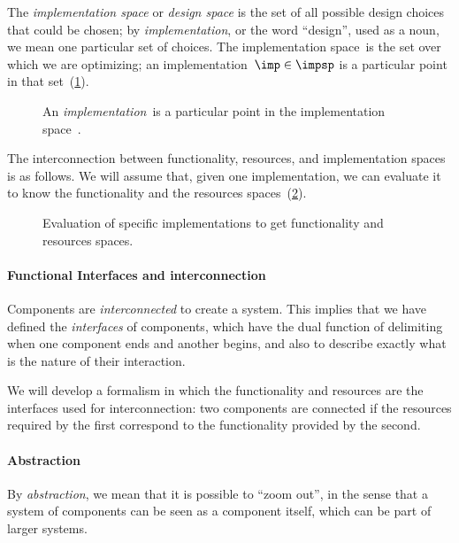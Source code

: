 The \emph{implementation space} or \textit{design space} is the set of all possible design choices that could be chosen; by \textit{implementation}, or the word ``design'', used as a noun, we mean one particular set of choices. The implementation space~\impsp is the set over which we are optimizing; an implementation~$\imp\in\impsp$ is a particular point in that set~(\cref{fig:impspace}).

\begin{figure}[h!]
    \begin{center}
    \end{center}
    \caption{An \emph{implementation}~\imp is a particular point in the implementation space~\impsp.}
    \label{fig:impspace}
\end{figure}


The interconnection between functionality, resources, and implementation spaces
is as follows. We will assume that, given one implementation, we can evaluate it
to know the functionality and the resources spaces~(\cref{fig:FIR}).

\begin{figure}[h!]
    \centering
    \caption{Evaluation of specific implementations to get functionality and resources spaces.\label{fig:FIR}}
\end{figure}

\paragraph{Functional Interfaces and interconnection}
Components are \emph{interconnected} to create a system.
This implies that we have defined the \emph{interfaces} of components, which
have the dual function of delimiting when one component ends and another begins,
and also to describe exactly what is the nature of their interaction.

We will develop a formalism in which the functionality and resources
are the interfaces used for interconnection: two components are connected
if the resources required by the first correspond to the functionality
provided by the second.

\paragraph{Abstraction}
By \emph{abstraction}, we mean that it is possible to ``zoom out'',
in the sense that a system of components can be seen as a component itself,
which can be part of larger systems.


